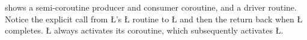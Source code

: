 \documentclass[openright,twoside]{report}
\begin{document}
 shows a semi-coroutine producer and consumer coroutine, and a driver routine.
Notice the explicit call from \LGinlinetrue\LGbegin\lgrinde\L{}\endlgrinde\LGend{}'s \LGinlinetrue\LGbegin\lgrinde\L{}\endlgrinde\LGend{} routine to \LGinlinetrue\LGbegin\lgrinde\L{}\endlgrinde\LGend{} and then the return back when \LGinlinetrue\LGbegin\lgrinde\L{}\endlgrinde\LGend{} completes.
\LGinlinetrue\LGbegin\lgrinde\L{}\endlgrinde\LGend{} always activates its coroutine, which subsequently activates \LGinlinetrue\LGbegin\lgrinde\L{}\endlgrinde\LGend{}.
\end{document}
